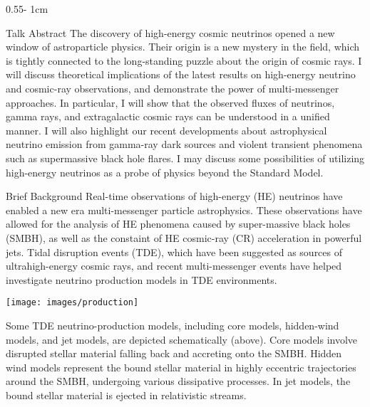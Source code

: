 \documentclass{../psuposter}
\begin{document}
\begin{frame}
\begin{columns}[t, totalwidth=\textwidth]
\begin{column}{0.55\textwidth - 1cm}
    \begin{block}{Talk Abstract}
         The discovery of high-energy cosmic neutrinos opened a new window of astroparticle physics. Their origin is a new mystery in the field, which is tightly connected to the long-standing puzzle about the origin of cosmic rays. I will discuss theoretical implications of the latest results on high-energy neutrino and cosmic-ray observations, and demonstrate the power of multi-messenger approaches. In particular, I will show that the observed fluxes of neutrinos, gamma rays, and extragalactic cosmic rays can be understood in a unified manner. I will also highlight our recent developments about astrophysical neutrino emission from gamma-ray dark sources and violent transient phenomena such as supermassive black hole flares. I may discuss some possibilities of utilizing high-energy neutrinos as a probe of physics beyond the Standard Model.
    \end{block}


    \begin{block}{Brief Background}
        Real-time observations of high-energy (HE) neutrinos have enabled a new era  multi-messenger particle astrophysics. These observations have allowed for the analysis of HE phenomena caused by super-massive black holes (SMBH), as well as the constaint of HE cosmic-ray (CR) acceleration in powerful jets. \cite{muraseHighEnergyNeutrinoGammaRay2020} Tidal disruption events (TDE), which have been suggested as sources of ultrahigh-energy cosmic rays, and recent multi-messenger events have helped investigate neutrino production models in TDE environments.

        \begin{center}
		   	\texttt{[image: images/production]}    		
    	\end{center}
		 Some TDE neutrino-production models, including core models, hidden-wind models, and jet models, are depicted schematically (above). \cite{muraseHighEnergyNeutrinoGammaRay2020} Core models involve disrupted stellar material falling back and accreting onto the SMBH. Hidden wind models represent the bound stellar material in highly eccentric trajectories around the SMBH, undergoing various dissipative processes. In jet models, the bound stellar material is ejected in relativistic streams. \cite{muraseHighEnergyNeutrinoGammaRay2020}


\end{block}
\end{column}
\end{columns}
\end{frame}
\end{document}
